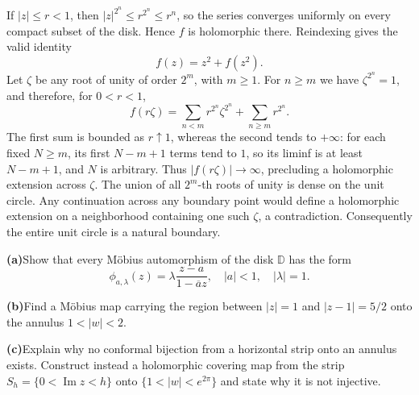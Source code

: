 \begin{solution}
If $|z|\le r<1$, then $|z|^{2^n}\le r^{2^n}\le r^n$, so the series
converges uniformly on every compact subset of the disk.
Hence $f$ is holomorphic there. Reindexing gives the valid identity
\[
f(z)=z^2+f(z^2).
\]
Let $\zeta$ be any root of unity of order $2^m$, with $m\ge1$.
For $n\ge m$ we have $\zeta^{2^n}=1$, and therefore, for $0<r<1$,
\[
 f(r\zeta)=\sum_{n<m}r^{2^n}\zeta^{2^n}
 +\sum_{n\ge m}r^{2^n}.
\]
The first sum is bounded as $r\uparrow1$, whereas the second tends
to $+\infty$: for each fixed $N\ge m$, its first $N-m+1$ terms tend
to $1$, so its liminf is at least $N-m+1$, and $N$ is arbitrary.
Thus $|f(r\zeta)|\to\infty$, precluding a holomorphic extension across $\zeta$.
The union of all $2^m$-th roots of unity is dense on the unit circle.
Any continuation across any boundary point would define a holomorphic
extension on a neighborhood containing one such $\zeta$, a contradiction.
Consequently the entire unit circle is a natural boundary.
\end{solution}

\begin{problem}[CP-IV-0123]
\label{prob:cp-iv-0123}

\par\medskip\noindent\textbf{(a)}\quad Show that every Möbius automorphism of the disk $\mathbb D$ has the form
\[\phi_{a,\lambda}(z)=\lambda\frac{z-a}{1-\overline a z},\quad |a|<1,\quad |\lambda|=1.\]

\par\medskip\noindent\textbf{(b)}\quad Find a Möbius map carrying the region between $|z|=1$ and $|z-1|=5/2$ onto the annulus $1<|w|<2$.

\par\medskip\noindent\textbf{(c)}\quad Explain why no conformal bijection from a horizontal strip onto an annulus exists. Construct instead a holomorphic covering map from the strip $S_h=\{0<\operatorname{Im}z<h\}$ onto $\{1<|w|<e^{2\pi}\}$ and state why it is not injective.

\end{problem}



